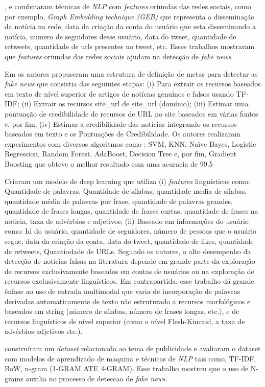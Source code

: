 \citet{Wu2021530}, e \citet{Mouratidis20211} combinaram técnicas de \textit{NLP} com \textit{features} oriundas das redes sociais, como por exemplo, \textit{Graph Embedding technique (GEB)} que representa a disseminação da notícia na rede, data da criação da conta do usuário que esta disseminando a notícia, numero de seguidores desse usuário, data do tweet, quantidade de retweets, quantidade de urls presentes no tweet, etc. Esses trabalhos mostraram que \textit{features} oriundas das redes sociais ajudam na detecção de \textit{fake news}.

Em \citet{SelvaBirunda2021406} os autores propuseram uma estrutura de definição de metas para detectar as \textit{fake news} que consistia das seguintes etapas: (i) Para extrair os recursos baseados em texto de nível superior de artigos de notícias genuínos e falsos usando TF-IDF; (ii) Extrair os recursos site\_url de site\_url (domínio); (iii) Estimar uma pontuação de credibilidade de recursos de URL no site baseados em várias fontes e, por fim, (iv) Estimar a credibilidade das notícias integrando os recursos baseados em texto e os Pontuações de Credibilidade. Os autores realizaram experimentos com diversos algoritmos como : SVM, KNN, Naïve Bayes, Logistic Regression, Random Forest, AdaBoost, Decision Tree e, por fim, Gradient Boosting que obteve o melhor resultado com uma acuracia de 99.5%

\citet{Mouratidis20211} Criaram um modelo de deep learning que utiliza (i) \textit{features} linguísticas como: Quantidade de palavras, Quantidade de sílabas, quantidade media de sílabas, quantidade média de palavras por frase, quantidade de palavras grandes, quantidade de frases longas, quantidade de frases curtas, quantidade de frases na noticia, taxa de advérbios e adjetivos; (ii) Baseado em informações do usuário como: Id do usuário, quantidade de seguidores, número de pessoas que o usuário segue, data da criação da conta, data do tweet, quantidade de likes, quantidade de retweets, Quantiodade de URLs. Segundo os autores, o alto desempenho da detecção de notícias falsas na literatura depende em grande parte da exploração de recursos exclusivamente baseados em contas de usuários ou na exploração de recursos exclusivamente linguísticos. Em contrapartida, esse trabalho dá grande ênfase ao uso de entrada multimodal que varia de incorporação de palavras derivadas automaticamente de texto não estruturado a recursos morfológicos e baseados em string (número de sílabas, número de frases longas, etc.), e de recursos linguísticos de nível superior (como o nível Flesh-Kincaid, a taxa de advérbios-adjetivos etc.).

\citet{Setiawan2021} construíram um \textit{dataset} relacionado ao tema de publicidade e avaliaram o dataset com modelos de aprendizado de maquina e técnicas de \textit{NLP} tais como, TF-IDF, BoW, n-gram (1-GRAM ATE 4-GRAM). Esse trabalho mostrou que o uso de N-grams auxilia no processo de deteccao de \textit{fake news}.